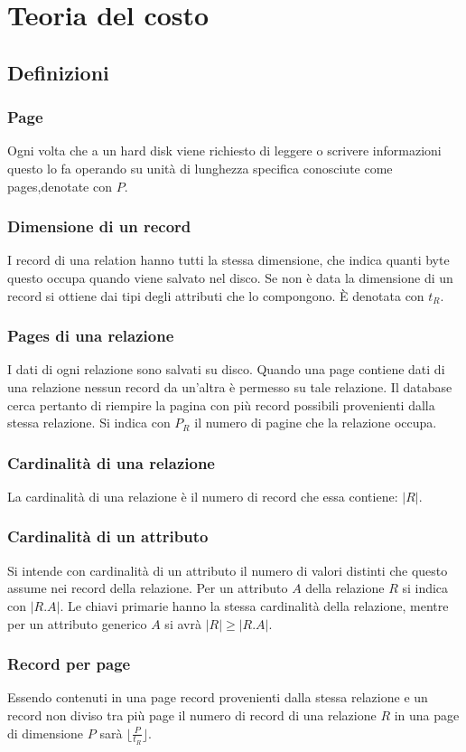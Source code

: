 \chapter{Teoria del costo}
\section{Definizioni}
\subsection{Page}
Ogni volta che a un hard disk viene richiesto di leggere o scrivere informazioni questo lo fa operando su unit\`a di lunghezza specifica conosciute come 
pages,denotate con $P$.
\subsection{Dimensione di un record}
I record di una relation hanno tutti la stessa dimensione, che indica quanti byte questo occupa quando viene salvato nel disco. Se non \`e data la dimensione
di un record si ottiene dai tipi degli attributi che lo compongono. \`E denotata con $t_R$.
\subsection{Pages di una relazione}
I dati di ogni relazione sono salvati su disco. Quando una page contiene dati di una relazione nessun record da un'altra \`e permesso su tale relazione. 
Il database cerca pertanto di riempire la pagina con pi\`u record possibili provenienti dalla stessa relazione. Si indica con $P_R$ il numero di pagine che
la relazione occupa.
\subsection{Cardinalit\`a di una relazione}
La cardinalit\`a di una relazione \`e il numero di record che essa contiene: $|R|$.
\subsection{Cardinalit\`a di un attributo}
Si intende con cardinalit\`a di un attributo il numero di valori distinti che questo assume nei record della relazione. Per un attributo $A$ della relazione
$R$ si indica con $|R.A|$. Le chiavi primarie hanno la stessa cardinalit\`a della relazione, mentre per un attributo generico $A$ si avr\`a $|R|\ge|R.A|$.
\subsection{Record per page}
Essendo contenuti in una page record provenienti dalla stessa relazione e un record non diviso tra pi\`u page il numero di record di una relazione $R$ in
una page di dimensione $P$ sar\`a $\lfloor\frac{P}{t_R}\rfloor$.
